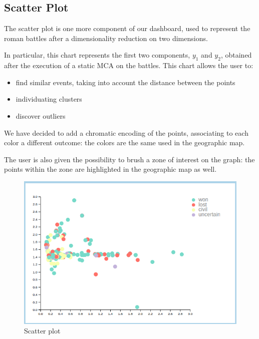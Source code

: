\subsection{Scatter Plot}
The scatter plot is one more component of our dashboard, used to represent the roman battles after a dimensionality reduction on two dimensions.

In particular, this chart represents the first two components, $y_1$ and $y_2$, obtained after the execution of a static MCA on the battles. This chart allows the user to:
\begin{itemize}
    \item find similar events, taking into account the distance between the points
    \item individuating clusters
    \item discover outliers
\end{itemize}

We have decided to add a chromatic encoding of the points, associating to each color a different outcome: the colors are the same used in the geographic map.

The user is also given the possibility to brush a zone of interest on the graph: the points within the zone are highlighted in the geographic map as well.
\begin{figure}[h]
\centering
\includegraphics[scale=0.30]{./images/scatter_plot.png}
\caption{Scatter plot}
\end{figure}

